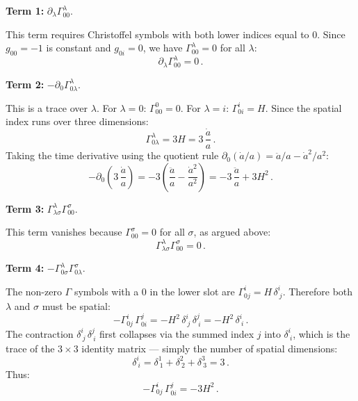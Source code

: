 \medskip\noindent\textbf{Term 1:} $\partial_\lambda\Gamma^\lambda_{00}$.

This term requires Christoffel symbols with both lower indices equal to 0. Since $g_{00}=-1$ is constant and $g_{0i}=0$, we have $\Gamma^\lambda_{00}=0$ for all $\lambda$:
\begin{equation}
    \partial_\lambda\Gamma^\lambda_{00} = 0\,.
\end{equation}

\medskip\noindent\textbf{Term 2:} $-\partial_0\Gamma^\lambda_{0\lambda}$.

This is a trace over $\lambda$. For $\lambda=0$: $\Gamma^0_{00}=0$. For $\lambda=i$: $\Gamma^i_{0i}=H$. Since the spatial index runs over three dimensions:
\begin{equation}
    \Gamma^\lambda_{0\lambda} = 3H = 3\,\frac{\dot{a}}{a}\,.
\end{equation}
Taking the time derivative using the quotient rule $\partial_0(\dot{a}/a)=\ddot{a}/a-\dot{a}^2/a^2$:
\begin{equation}
    -\partial_0\!\left(3\,\frac{\dot{a}}{a}\right) = -3\left(\frac{\ddot{a}}{a} - \frac{\dot{a}^2}{a^2}\right) = -3\,\frac{\ddot{a}}{a} + 3H^2\,.
\end{equation}

\medskip\noindent\textbf{Term 3:} $\Gamma^\lambda_{\lambda\sigma}\Gamma^\sigma_{00}$.

This term vanishes because $\Gamma^\sigma_{00}=0$ for all $\sigma$, as argued above:
\begin{equation}
    \Gamma^\lambda_{\lambda\sigma}\Gamma^\sigma_{00} = 0\,.
\end{equation}

\medskip\noindent\textbf{Term 4:} $-\Gamma^\lambda_{0\sigma}\Gamma^\sigma_{0\lambda}$.

The non-zero $\Gamma$ symbols with a 0 in the lower slot are $\Gamma^i_{0j}=H\,\delta^i_{\ j}$. Therefore both $\lambda$ and $\sigma$ must be spatial:
\begin{equation}
    -\Gamma^i_{0j}\,\Gamma^j_{0i} = -H^2\,\delta^i_{\ j}\,\delta^j_{\ i} = -H^2\,\delta^i_{\ i}\,.
\end{equation}
The contraction $\delta^i_{\ j}\,\delta^j_{\ i}$ first collapses via the summed index $j$ into $\delta^i_{\ i}$, which is the trace of the $3\times 3$ identity matrix --- simply the number of spatial dimensions:
\begin{equation}
    \delta^i_{\ i} = \delta^1_{\ 1}+\delta^2_{\ 2}+\delta^3_{\ 3} = 3\,.
\end{equation}
Thus:
\begin{equation}
    -\Gamma^i_{0j}\,\Gamma^j_{0i} = -3H^2\,.
\end{equation}

